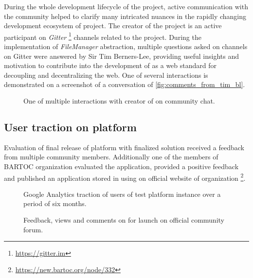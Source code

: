 During the whole development lifecycle of the \lpas{} project, active communication with the community helped to clarify many intricated nuances in the rapidly changing development ecosystem of \solid{} project. The creator of the \solid{} project is an active participant on \textit{Gitter} \footnote{\url{https://gitter.im}} channels related to the project. During the implementation of \textit{FileManager} abstraction, multiple questions asked on \solid{} channels on Gitter were answered by Sir Tim Berners-Lee, providing useful insights and motivation to contribute into the development of \solid{} as a web standard for decoupling and decentralizing the web. One of several interactions is demonstrated on a screenshot of a conversation of \autoref{fig:comments_from_tim_bl}.

\begin{figure}[h]
\centering
{}
\caption{One of multiple interactions with creator of \solid{} on \solid{} community chat.}
\label{fig:comments_from_tim_bl}
\end{figure}

\subsection{User traction on \lpa{} platform}
\label{sssec:user_traction_of_platform}

Evaluation of final release of \lpa{} platform with finalized \lpas{} solution received a feedback from multiple \solid{} community members. Additionally one of the members of \gls{BARTOC} organization evaluated the application, provided a positive feedback and published an application stored in \solid{} using \lpas{} on official website of organization \footnote{\url{https://new.bartoc.org/node/332}}. 

\begin{figure}[hbt]
  \caption{Google Analytics traction of users of test \lpa{} platform instance over a period of six months.}
  \label{fig:google_analytics_users}
\endminipage\hfill
{}
  \caption{Feedback, views and comments on for \lpa{} launch on official \solid{} community forum.}
  \label{fig:community_post_users}
\endminipage\hfill
\end{figure}

